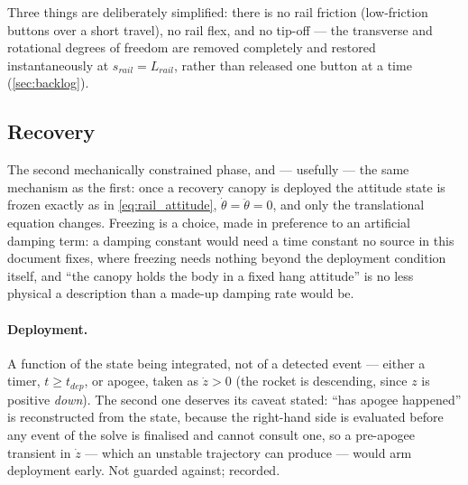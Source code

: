 Three things are deliberately simplified: there is no rail friction (low-friction buttons over a
short travel), no rail flex, and no tip-off --- the transverse and rotational degrees of freedom
are removed completely and restored instantaneously at $s_{rail}=L_{rail}$, rather than released
one button at a time (\autoref{sec:backlog}).

\subsection{Recovery}\label{sec:recovery}
The second mechanically constrained phase, and --- usefully --- the same mechanism as the first:
once a recovery canopy is deployed the attitude state is frozen exactly as in
\autoref{eq:rail_attitude}, $\dot\theta=\ddot\theta=0$, and only the translational equation
changes. Freezing is a choice, made in preference to an artificial damping term: a damping constant
would need a time constant no source in this document fixes, where freezing needs nothing beyond
the deployment condition itself, and ``the canopy holds the body in a fixed hang attitude'' is no
less physical a description than a made-up damping rate would be.

\paragraph{Deployment.} A function of the state being integrated, not of a detected event ---
either a timer, $t\geq t_{dep}$, or apogee, taken as $\dot{z}>0$ (the rocket is descending, since
$z$ is positive \emph{down}). The second one deserves its caveat stated: ``has apogee happened''
is reconstructed from the state, because the right-hand side is evaluated before any event of the
solve is finalised and cannot consult one, so a pre-apogee transient in $\dot{z}$ --- which an
unstable trajectory can produce --- would arm deployment early. Not guarded against; recorded.

